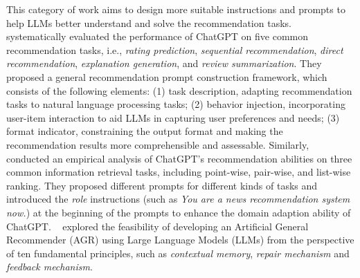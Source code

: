 \documentclass[sn-mathphys-num]{sn-jnl}%
\theoremstyle{thmstyleone}%
\theoremstyle{thmstyletwo}%
\theoremstyle{thmstylethree}%
\begin{document}




This category of work aims to design more suitable instructions and prompts to help LLMs better understand and solve the recommendation tasks. 
~\cite{DBLP:journals/corr/abs-2304-10149} systematically evaluated the performance of ChatGPT on five common recommendation tasks, i.e., \textit{rating prediction}, \textit{sequential recommendation}, \textit{direct recommendation}, \textit{explanation generation}, and \textit{review summarization}. They proposed a general recommendation prompt construction framework, which consists of the following elements: (1) task description, adapting recommendation tasks to natural language processing tasks; (2) behavior injection, incorporating user-item interaction to aid LLMs in capturing user preferences and needs; (3) format indicator, constraining the output format and making the recommendation results more comprehensible and assessable. Similarly, ~\cite{DBLP:journals/corr/abs-2305-02182} conducted an empirical analysis of ChatGPT's recommendation abilities on three common information retrieval tasks, including point-wise, pair-wise, and list-wise ranking.
They proposed different prompts for different kinds of tasks and introduced the \textit{role} instructions (such as \textit{You are a news recommendation system now.}) at the beginning of the prompts to enhance the domain adaption ability of ChatGPT.
~\cite{DBLP:journals/corr/abs-2305-04518} explored the feasibility of developing an Artificial General Recommender (AGR) using Large Language Models (LLMs) from the perspective of ten fundamental principles, such as \textit{contextual memory}, \textit{repair mechanism} and \textit{feedback mechanism}.
\end{document}
